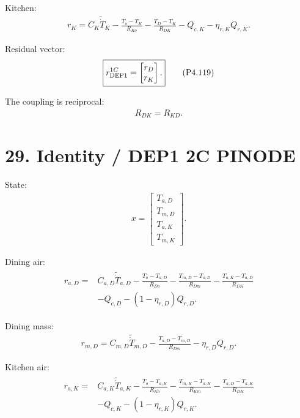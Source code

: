 \documentclass[11pt]{article}
\begin{document}
Kitchen:
\begin{align}
\boxed{
r_K
=
C_K\widetilde{\dot T}_K
-
\frac{T_o-T_K}{R_{Ko}}
-
\frac{T_D-T_K}{R_{DK}}
-
Q_{c,K}
-
\eta_{r,K}Q_{r,K}.
}
\tag{P4.118}
\end{align}

Residual vector:
\begin{align}
\boxed{
r_{\rm DEP1}^{1C}
=
\begin{bmatrix}
r_D\\r_K
\end{bmatrix}.
}
\tag{P4.119}
\end{align}

The coupling is reciprocal:
\begin{align}
\boxed{R_{DK}=R_{KD}.}
\tag{P4.120}
\end{align}

\section*{29. Identity / DEP1 2C PINODE}

State:
\begin{align}
\boxed{
x=
\begin{bmatrix}
T_{a,D}\\T_{m,D}\\T_{a,K}\\T_{m,K}
\end{bmatrix}.
}
\tag{P4.121}
\end{align}

Dining air:
\begin{align}
\boxed{
\begin{aligned}
r_{a,D}
={}&
C_{a,D}\widetilde{\dot T}_{a,D}
-
\frac{T_o-T_{a,D}}{R_{Do}}
-
\frac{T_{m,D}-T_{a,D}}{R_{Dm}}
-
\frac{T_{a,K}-T_{a,D}}{R_{DK}}
\\
&-
Q_{c,D}
-
(1-\eta_{r,D})Q_{r,D}.
\end{aligned}
}
\tag{P4.122}
\end{align}

Dining mass:
\begin{align}
\boxed{
r_{m,D}
=
C_{m,D}\widetilde{\dot T}_{m,D}
-
\frac{T_{a,D}-T_{m,D}}{R_{Dm}}
-
\eta_{r,D}Q_{r,D}.
}
\tag{P4.123}
\end{align}

Kitchen air:
\begin{align}
\boxed{
\begin{aligned}
r_{a,K}
={}&
C_{a,K}\widetilde{\dot T}_{a,K}
-
\frac{T_o-T_{a,K}}{R_{Ko}}
-
\frac{T_{m,K}-T_{a,K}}{R_{Km}}
-
\frac{T_{a,D}-T_{a,K}}{R_{DK}}
\\
&-
Q_{c,K}
-
(1-\eta_{r,K})Q_{r,K}.
\end{aligned}
}
\tag{P4.124}
\end{align}
\end{document}
